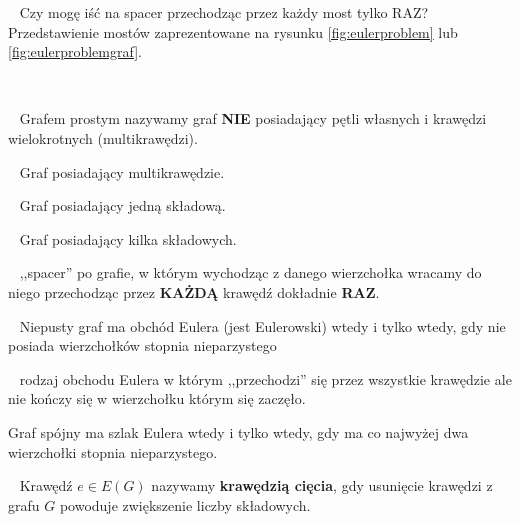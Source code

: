 \begin{problem*}[Eulera]~ %
Czy mogę iść na spacer przechodząc przez każdy most tylko RAZ?
Przedstawienie mostów zaprezentowane na rysunku \ref{fig:eulerproblem} lub \ref{fig:eulerproblemgraf}.
\end{problem*}~ %
\begin{definition}~ %
Grafem prostym nazywamy graf \textbf{NIE} posiadający pętli własnych i krawędzi wielokrotnych (multikrawędzi). 
\end{definition}
\begin{definition}[Multigraf]~ %
Graf posiadający multikrawędzie.
\end{definition}
\begin{definition}~ %
Graf posiadający jedną składową.
\end{definition}
\begin{definition}~ %
Graf posiadający kilka składowych.
\end{definition}
\begin{definition}~ %
,,spacer'' po grafie, w którym wychodząc z danego wierzchołka wracamy do niego przechodząc przez \textbf{KAŻDĄ} krawędź dokładnie \textbf{RAZ}.
\end{definition}
\begin{theorem}[Euler]\label{the:euler}~ %
Niepusty graf ma obchód Eulera (jest Eulerowski) wtedy i tylko  wtedy, gdy nie posiada wierzchołków stopnia nieparzystego
\end{theorem}
\begin{definition}~ %
rodzaj obchodu Eulera w którym ,,przechodzi'' się przez wszystkie krawędzie ale nie kończy się w wierzchołku którym się zaczęło.
\end{definition}
\begin{remark}
Graf spójny ma szlak Eulera wtedy i tylko  wtedy, gdy ma co najwyżej dwa wierzchołki stopnia nieparzystego.
\end{remark}
\begin{definition}~ %
Krawędź $e\in E(G)$ nazywamy \textbf{krawędzią cięcia}, gdy usunięcie krawędzi z grafu $G$ powoduje zwiększenie liczby składowych.
\end{definition}
